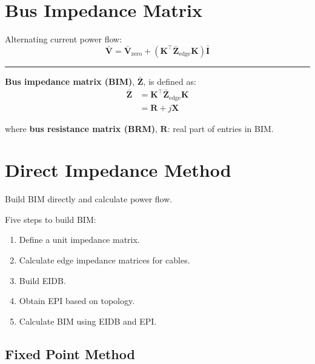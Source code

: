 \documentclass[
]{book}
\providecommand{\tightlist}{%
  \setlength{\itemsep}{0pt}\setlength{\parskip}{0pt}}
\begin{document}
\hypertarget{BIM}{%
\section{Bus Impedance Matrix}\label{BIM}}

Alternating current power flow:
\[
  \bar{\boldsymbol{V}} = \bar{\boldsymbol{V}}_{\text{zero}}
    + \left( \boldsymbol{K}^{\top} \boldsymbol{\bar{Z}}_\text{edge}
    \boldsymbol{K} \right) \bar{\boldsymbol{I}}
\]

\begin{center}\rule{0.5\linewidth}{0.5pt}\end{center}

\textbf{Bus impedance matrix (BIM)}, \(\boldsymbol{\bar{Z}}\), is defined as:
\[ \begin{aligned}
  \boldsymbol{\bar{Z}}
    &= \boldsymbol{K}^{\top} \boldsymbol{\bar{Z}}_\text{edge}
    \boldsymbol{K} \\
    &= \boldsymbol{R} + j \boldsymbol{X}
\end{aligned} \]

where \textbf{bus resistance matrix (BRM)}, \(\boldsymbol{R}\): real part of entries
in BIM.

\hypertarget{power-flow}{%
\section{Direct Impedance Method}\label{power-flow}}

Build BIM directly and calculate power flow. \citep{schneider2017analytic}

Five steps to build BIM:

\begin{enumerate}
\def\labelenumi{\arabic{enumi}.}
\tightlist
\item
  Define a unit impedance matrix.
\item
  Calculate edge impedance matrices for cables.
\item
  Build EIDB.
\item
  Obtain EPI based on topology.
\item
  Calculate BIM using EIDB and EPI.
\end{enumerate}

\hypertarget{fixed-point-method}{%
\subsection*{Fixed Point Method}\label{fixed-point-method}}
\end{document}
